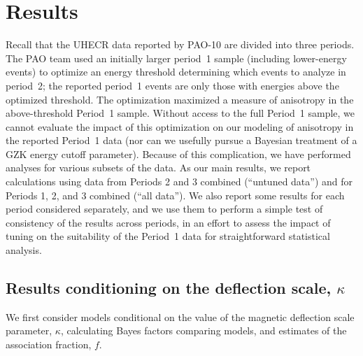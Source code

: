 \section{Results}
\label{sec:results}

Recall that the UHECR data reported by PAO-10 are divided into three periods.
The PAO team used an initially larger period~1 sample (including
lower-energy events) to optimize an energy threshold determining which
events to analyze in period~2; the reported period~1 events are only those
with energies above the optimized threshold.  The optimization maximized a
measure of anisotropy in the above-threshold Period~1 sample.  Without access
to the full Period~1 sample, we cannot evaluate the impact of this
optimization on our modeling of anisotropy in the reported Period~1 data
(nor can we usefully pursue a Bayesian treatment of a GZK energy cutoff
parameter).  Because of this complication, we have performed
analyses for various subsets of the data.  As our main results, we report
calculations using data from Periods 2 and 3 combined (``untuned data'') and
for Periods 1, 2, and 3 combined (``all data'').  We also report some
results for each period considered separately, and we use them to perform a
simple test of consistency of the results across periods, in an effort
to assess the impact of tuning on the suitability of the Period~1 data
for straightforward statistical analysis.

\subsection{Results conditioning on the deflection scale, $\kappa$}

We first consider models conditional on the value of the magnetic deflection
scale parameter, $\kappa$, calculating Bayes factors comparing models,
and estimates of the association fraction, $f$.

